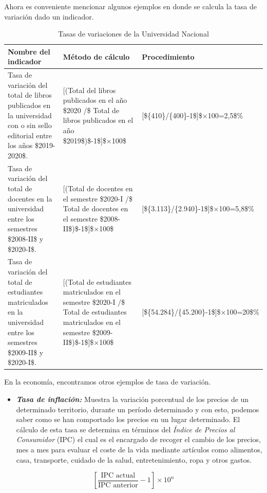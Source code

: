 \documentclass[
]{book}
\providecommand{\tightlist}{%
  \setlength{\itemsep}{0pt}\setlength{\parskip}{0pt}}
\begin{document}
Ahora es conveniente mencionar algunos ejemplos en donde se calcula la tasa de variación dado un indicador.

\begin{table}

\caption{\label{tab:unnamed-chunk-6}Tasas de variaciones de la Universidad Nacional}
\centering
\begin{tabular}[t]{l|l|l}
\hline
Nombre del indicador & Método de cálculo & Procedimiento\\
\hline
Tasa de variación del total de libros publicados en la universidad con o sin sello editorial entre los años \$2019-2020\$. & [(Total del libros publicados en el año \$2020 /\$ Total de libros publicados en el año \$2019\$)\$-1\$]\$×100\$ & [\$\{410\}/\{400\}-1\$]\$×100=2,5\$\%\\
\hline
Tasa de variación del total de docentes en la universidad entre los semestres \$2008-II\$ y \$2020-I\$. & [(Total de docentes  en el semestre \$2020-I /\$ Total de docentes en el semestre \$2008-II\$)\$-1\$]\$×100\$ & [\$\{3.113\}/\{2.940\}-1\$]\$×100=5,8\$\%\\
\hline
Tasa de variación del total de estudiantes matriculados en la universidad entre los semestres \$2009-II\$ y \$2020-I\$. & [(Total de estudiantes matriculados en el semestre \$2020-I /\$ Total de estudiantes matriculados en el semestre \$2009-II\$)\$-1\$]\$×100\$ & [\$\{54.284\}/\{45.200\}-1\$]\$×100=20\$\%\\
\hline
\end{tabular}
\end{table}

En la economía, encontramos otros ejemplos de tasa de variación.

\begin{itemize}
\tightlist
\item
  \textbf{\emph{Tasa de inflación:}} Muestra la variación porcentual de los precios de un determinado territorio, durante un período determinado y con esto, podemos saber como se han comportado los precios en un lugar determinado. El cálculo de esta tasa se determina en términos del \emph{Índice de Precios al Consumidor} (IPC) el cual es el encargado de recoger el cambio de los precios, mes a mes para evaluar el coste de la vida mediante artículos como alimentos, casa, transporte, cuidado de la salud, entretenimiento, ropa y otros gastos.
\end{itemize}

\[\begin{equation}
\left[\frac{\text{IPC actual}}{\text{IPC anterior}}-1\right]\times 10^{n}
\end{equation}\]
\end{document}
